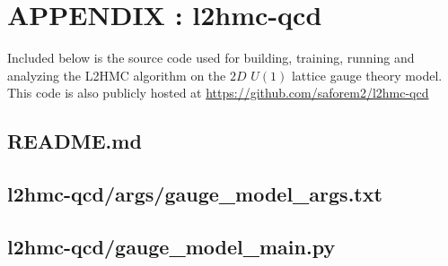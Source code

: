 \section{APPENDIX \hbAppendixPrefix: l2hmc-qcd}
Included below is the source code used for building, training, running and analyzing the L2HMC algorithm on the $2D\,\,
U(1)$ lattice gauge theory model. This code is also publicly hosted at \url{https://github.com/saforem2/l2hmc-qcd}


\subsection{README.md}
\lstset{style=markdown}


\clearpage
\subsection{l2hmc-qcd/args/gauge\_model\_args.txt}






\clearpage
\subsection{l2hmc-qcd/gauge\_model\_main.py}
\lstset{style=mypython}


